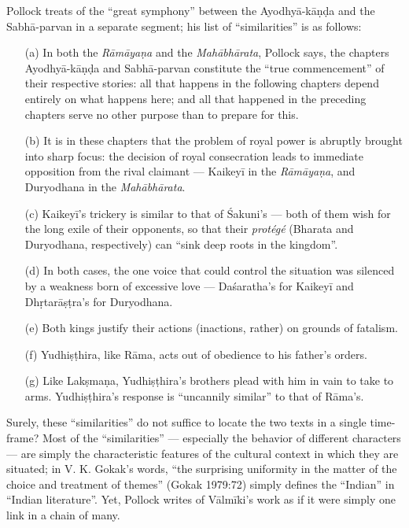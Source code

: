 Pollock treats of the “great symphony” between the Ayodhyā-kāṇḍa and the Sabhā-parvan in a separate segment; his list of “similarities” is as follows: 
\begin{itemize}
\item[(a)] In both the {\sl Rāmāyaṇa} and the {\sl Mahābhārata}, Pollock says, the chapters Ayodhyā-kāṇḍa and Sabhā-parvan constitute the “true commencement” of their respective stories: all that happens in the following chapters depend entirely on what happens here; and all that happened in the preceding chapters serve no other purpose than to prepare for this.

\item[(b)] It is in these chapters that the problem of royal power is abruptly brought into sharp focus: the decision of royal consecration leads to immediate opposition from the rival claimant --- Kaikeyī in the {\sl Rāmāyaṇa}, and Duryodhana in the {\sl Mahābhārata}. 

\item[(c)] Kaikeyī’s trickery is similar to that of Śakuni’s --- both of them wish for the long exile of their opponents, so that their {\sl protégé} (Bharata and Duryodhana, respectively) can “sink deep roots in the kingdom”. 

\item[(d)] In both cases, the one voice that could control the situation was silenced by a weakness born of excessive love --- Daśaratha’s for Kaikeyī and Dhṛtarāṣṭra’s for Duryodhana.  

\item[(e)] Both kings justify their actions (inactions, rather) on grounds of fatalism.

\item[(f)] Yudhiṣṭhira, like Rāma, acts out of obedience to his father’s orders. 

\item[(g)] Like Lakṣmaṇa, Yudhiṣṭhira’s brothers plead with him in vain to take to arms. Yudhiṣṭhira’s response is “uncannily similar” to that of Rāma’s.  
\end{itemize}

Surely, these “similarities” do not suffice to locate the two texts in a single time-frame? Most of the “similarities” --- especially the behavior of different characters --- are simply the characteristic features of the cultural context in which they are situated; in V. K. Gokak’s words, “the surprising uniformity in the matter of the choice and treatment of themes” (Gokak 1979:72) simply defines the “Indian” in “Indian literature”. Yet, Pollock writes of Vālmīki’s work as if it were simply one link in a chain of many. 

